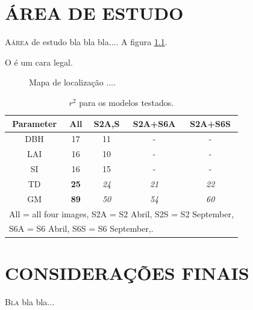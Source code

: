 \documentclass[
    oneside,
    a4paper,
    12pt
]{book}
\begin{document}
\chapter{ÁREA DE ESTUDO}

\lettrine{A}{área} de estudo bla bla bla....  A figura \ref{fig:estudo}.

O \cite{ATeuner95} é um cara legal.

\begin{figure}[bp]
 \begin{center}
\end{center}
\caption{ \label{fig:estudo} Mapa de localização ....}
\end{figure}

\begin{table}[h]
  \centering
  \caption{$r^{2}$ para os modelos testados.}\label{TB:regressao}
\begin{tabular}{c c c c c}
  \hline
  Parameter & All & S2A,S & S2A+S6A & S2A+S6S \\
  \hline
  DBH & 17 & 11 & - & - \\
  LAI & 16 & 10 & - & - \\
  SI & 16 & 15 & - & - \\
  TD & \textbf{25} & \emph{24} & \emph{21} & \emph{22} \\
  GM & \textbf{89} & \emph{50} & \emph{54} & \emph{60} \\
  \hline
  \multicolumn{5}{l}{All = all four images, S2A = S2 Abril, S2S = S2 September,}\\
  \multicolumn{5}{l}{S6A = S6 Abril, S6S = S6 September,.}
\end{tabular}
\end{table}


\chapter{CONSIDERAÇÕES FINAIS} \lettrine{B}{la} bla bla...





\appendix
\end{document}
